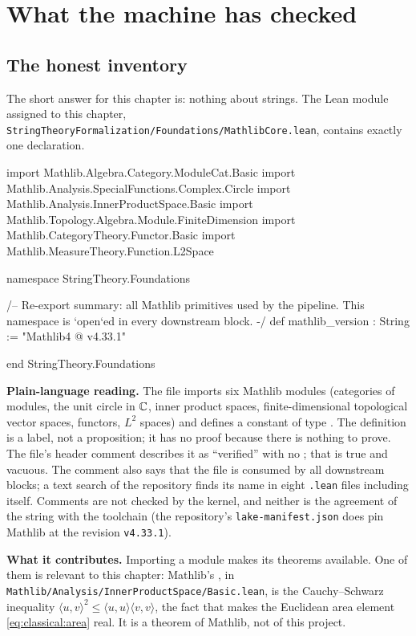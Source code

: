 \section{What the machine has checked}\label{sec:classical:lean}

\subsection{The honest inventory}

The short answer for this chapter is: nothing about strings. The Lean module assigned to
this chapter, \texttt{StringTheoryFormalization/Foundations/MathlibCore.lean}, contains
exactly one declaration.

\begin{leanbox}
\begin{leancode}
import Mathlib.Algebra.Category.ModuleCat.Basic
import Mathlib.Analysis.SpecialFunctions.Complex.Circle
import Mathlib.Analysis.InnerProductSpace.Basic
import Mathlib.Topology.Algebra.Module.FiniteDimension
import Mathlib.CategoryTheory.Functor.Basic
import Mathlib.MeasureTheory.Function.L2Space

namespace StringTheory.Foundations

/-- Re-export summary: all Mathlib primitives used by the pipeline.
    This namespace is `open`ed in every downstream block. -/
def mathlib_version : String := "Mathlib4 @ v4.33.1"

end StringTheory.Foundations
\end{leancode}
\textbf{Plain-language reading.} The file imports six Mathlib modules (categories of modules,
the unit circle in $\mathbb{C}$, inner product spaces, finite-dimensional topological vector spaces,
functors, $L^2$ spaces) and defines a constant of type . The definition
 is a label, not a proposition; it has no
proof because there is nothing to prove. The file's header comment describes it as
``verified'' with no ; that is true and vacuous. The comment also says that the
file is consumed by all downstream blocks; a text search of the repository finds its name
in eight \texttt{.lean} files including itself. Comments are not checked by the kernel, and
neither is the agreement of the string with the toolchain (the repository's
\texttt{lake-manifest.json} does pin Mathlib at the revision \texttt{v4.33.1}).

\textbf{What it contributes.} Importing a module makes its theorems available. One of them is
relevant to this chapter: Mathlib's , in
\texttt{Mathlib/Analysis/InnerProductSpace/Basic.lean}, is the Cauchy--Schwarz inequality
$\langle u,v\rangle^2\le\langle u,u\rangle\langle v,v\rangle$, the fact that makes the
Euclidean area element \eqref{eq:classical:area} real. It is a theorem of Mathlib, not of
this project.
\end{leanbox}

